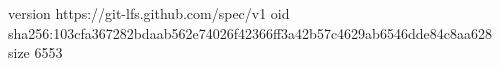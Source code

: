 version https://git-lfs.github.com/spec/v1
oid sha256:103cfa367282bdaab562e74026f42366ff3a42b57c4629ab6546dde84c8aa628
size 6553
